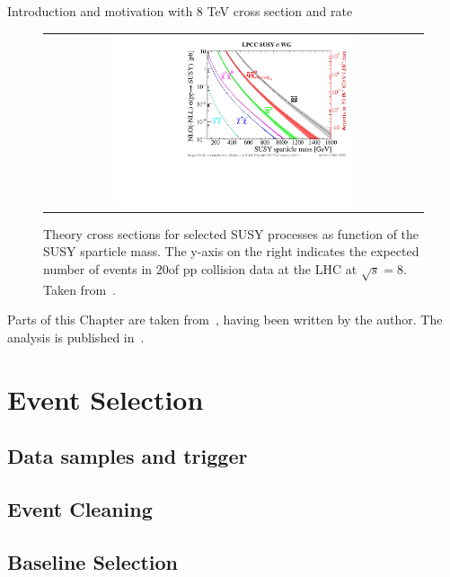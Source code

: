 Introduction and motivation with 8 TeV cross section and rate

\begin{figure}[!h]
  \centering
  \begin{tabular}{c}
                \includegraphics[width=0.65\textwidth]{figures/xsections_strong.pdf} 
  \end{tabular}
  \caption{Theory cross sections for selected SUSY processes as function of the SUSY sparticle mass. The y-axis on the right indicates the expected number of events in 20\fbinv of pp collision data at the LHC at $\sqrt{s}=8$\tev. Taken from~\cite{Kramer:2012bx}.}
  \label{fig:result_comparison}
\end{figure}

Parts of this Chapter are taken from~\cite{bib:AN-12-350}, having been written by the author. The analysis is published in~\cite{Chatrchyan:2014lfa}.  

\section{Event Selection}
\label{sec:RA2_sel}

\subsection{Data samples and trigger}
\label{subsec:RA2_samples_trigger}

\subsection{Event Cleaning}
\label{subsec:RA2_cleaning}

\subsection{Baseline Selection}
\label{subsec:RA2_baseline}

